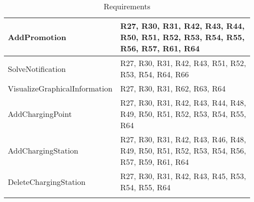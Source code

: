 \begin{center}
\begin{longtable}[H]{|p{0.4\linewidth}|p{0.6\linewidth}|}
     \hline
     AddPromotion & R27, R30, R31, R42, R43, R44, R50, R51, R52, R53, R54, R55, R56, R57, R61, R64 \\
     \hline
     SolveNotification & R27, R30, R31, R42, R43, R51, R52, R53, R54, R64, R66\\
     \hline
     VisualizeGraphicalInformation & R27, R30, R31, R62, R63, R64 \\
     \hline
     AddChargingPoint & R27, R30, R31, R42, R43, R44, R48, R49, R50, R51, R52, R53, R54, R55, R64 \\
     \hline
     AddChargingStation & R27, R30, R31, R42, R43, R46, R48, R49, R50, R51, R52, R53, R54, R56, R57, R59, R61, R64\\
     \hline
     DeleteChargingStation & R27, R30, R31, R42, R43, R45, R53, R54, R55, R64\\
     \hline
    \caption{Requirements}
    \label{tab:Requirements}
    \end{longtable}
\end{center}